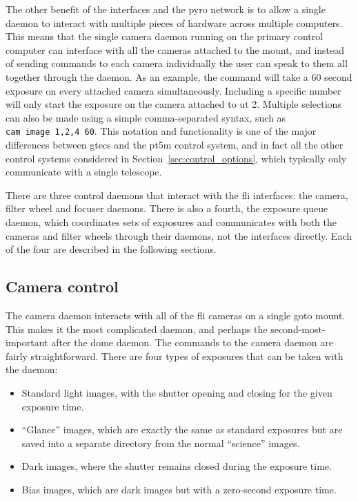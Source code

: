 \begin{colsection}
\begin{colsection}
The other benefit of the interfaces and the \gls{pyro} network is to allow a single daemon to interact with multiple pieces of hardware across multiple computers. This means that the single camera daemon running on the primary control computer can interface with all the cameras attached to the mount, and instead of sending commands to each camera individually the user can speak to them all together through the daemon. As an example, the command  will take a 60 second exposure on every attached camera simultaneously. Including a specific number  will only start the exposure on the camera attached to \gls{ut} 2. Multiple selections can also be made using a simple comma-separated syntax, such as \texttt{cam~image~1,2,4~60}. This notation and functionality is one of the major differences between \gls{gtecs} and the \gls{pt5m} control system, and in fact all the other control systems considered in Section~\ref{sec:control_options}, which typically only communicate with a single telescope.

There are three control daemons that interact with the \gls{fli} interfaces: the camera, filter wheel and focuser daemons. There is also a fourth, the exposure queue daemon, which coordinates sets of exposures and communicates with both the cameras and filter wheels through their daemons, not the interfaces directly. Each of the four are described in the following sections.

\end{colsection}


\subsection{Camera control}
\label{sec:cam}
\begin{colsection}

The camera daemon interacts with all of the \gls{fli} cameras on a single \gls{goto} mount. This makes it the most complicated daemon, and perhaps the second-most-important after the dome daemon. The commands to the camera daemon are fairly straightforward. There are four types of exposures that can be taken with the daemon:

\begin{itemize}
    \item Standard light images, with the shutter opening and closing for the given exposure time.
    \item ``Glance'' images, which are exactly the same as standard exposures but are saved into a separate directory from the normal ``science'' images.
    \item Dark images, where the shutter remains closed during the exposure time.
    \item Bias images, which are dark images but with a zero-second exposure time.
\end{itemize}


\end{colsection}
\end{colsection}
